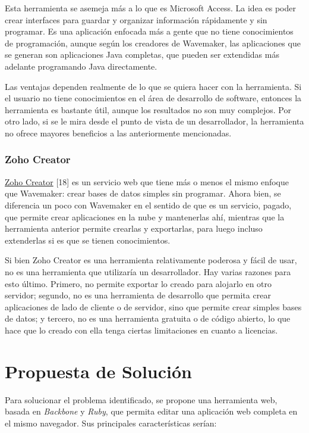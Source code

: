 \documentclass[12pt,titlepage,]{article}
\begin{document}
Esta herramienta se asemeja más a lo que es Microsoft Access. La idea es
poder crear interfaces para guardar y organizar información rápidamente
y sin programar. Es una aplicación enfocada más a gente que no tiene
conocimientos de programación, aunque según los creadores de Wavemaker,
las aplicaciones que se generan son aplicaciones Java completas, que
pueden ser extendidas más adelante programando Java directamente.

Las ventajas dependen realmente de lo que se quiera hacer con la
herramienta. Si el usuario no tiene conocimientos en el área de
desarrollo de software, entonces la herramienta es bastante útil, aunque
los resultados no son muy complejos. Por otro lado, si se le mira desde
el punto de vista de un desarrollador, la herramienta no ofrece mayores
beneficios a las anteriormente mencionadas.

\subsubsection{Zoho Creator}

\href{http://www.zoho.com/creator/}{Zoho Creator} {[}18{]} es un
servicio web que tiene más o menos el mismo enfoque que Wavemaker: crear
bases de datos simples sin programar. Ahora bien, se diferencia un poco
con Wavemaker en el sentido de que es un servicio, pagado, que permite
crear aplicaciones en la nube y mantenerlas ahí, mientras que la
herramienta anterior permite crearlas y exportarlas, para luego incluso
extenderlas si es que se tienen conocimientos.

Si bien Zoho Creator es una herramienta relativamente poderosa y fácil
de usar, no es una herramienta que utilizaría un desarrollador. Hay
varias razones para esto último. Primero, no permite exportar lo creado
para alojarlo en otro servidor; segundo, no es una herramienta de
desarrollo que permita crear aplicaciones de lado de cliente o de
servidor, sino que permite crear simples bases de datos; y tercero, no
es una herramienta gratuita o de código abierto, lo que hace que lo
creado con ella tenga ciertas limitaciones en cuanto a licencias.

\newpage

\section{Propuesta de Solución}

Para solucionar el problema identificado, se propone una herramienta
web, basada en \emph{Backbone} y \emph{Ruby}, que permita editar una
aplicación web completa en el mismo navegador. Sus principales
características serían:
\end{document}
